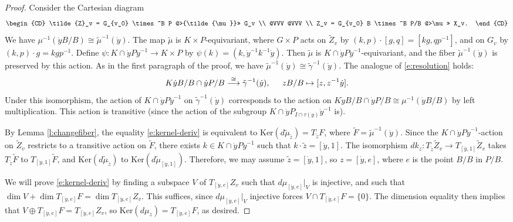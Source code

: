\documentclass[11pt,letterpaper,reqno]{amsart}
\numberwithin{equation}{section}
\theoremstyle{plain}
\theoremstyle{definition}
\theoremstyle{remark}
\begin{document}
\begin{proof}
Consider the Cartesian diagram
$$
\begin{CD}
\tilde{Z}_v = G_{v_0} \times^B P @>{\tilde{\mu}}>> G_v \\
@VVV @VVV \\
Z_v = G_{v_0} B \times^B P/B @>\mu>> X_v. 
\end{CD}
$$
We have $\mu^{-1}(\dot{y}B/B) \cong \tilde{\mu}^{-1}(\dot{y})$.
The map $\tilde{\mu}$ is $K \times P$-equivariant, where $G \times P$ acts on $\tilde{Z}_v$ by $(k, p) \cdot [g, q] = [k g, q p^{-1}]$, and on $G_v$ by $(k,p) \cdot g = k g p^{-1}$.
Define $\psi: K\cap \dot{y}P \dot{y}^{-1} \to K \times P$
by $\psi(k) = (k, \dot{y}^{-1} k^{-1} \dot{y})$.  Then $\tilde{\mu}$ is $K\cap \dot{y}P \dot{y}^{-1}$-equivariant, and the fiber $\tilde{\mu}^{-1}(\dot{y})$ is preserved
by this action.  As in the first paragraph of the proof, we have $\tilde{\mu}^{-1}(\dot{y}) \cong \tilde{\gamma}^{-1}(\dot{y})$.  The analogue of 
\eqref{e:resolution} holds:
\begin{equation} \label{e:resolution2}
 K\dot{y}B/B \cap \dot{y}P/B \stackrel{\cong}{\longrightarrow} \tilde{\gamma}^{-1}(\dot{y}), \hspace{0.2in} zB/B \mapsto [z, z^{-1}\dot{y} ].
\end{equation}
Under this isomorphism, the action of $K\cap \dot{y}P \dot{y}^{-1}$ on $\tilde{\gamma}^{-1}(\dot{y})$
corresponds to the action on $K\dot{y}B/B \cap \dot{y}P/B \cong  \mu^{-1}(\dot{y}B/B)$ by left multiplication.  This action
is transitive (since the action of the subgroup $K\cap \dot{y}P_{I \cap \tau(y)} \dot{y}^{-1}$ is).

By Lemma \ref{l:changefiber}, the equality \eqref{e:kernel-deriv} is equivalent to
$\mathrm{Ker}(d \tilde{\mu}_{\tilde{z}})=T_{\tilde{z}} F$,
where $\tilde{F} = \tilde{\mu}^{-1}(\dot{y})$.  Since
the $K \cap \dot{y}P \dot{y}^{-1}$-action on $\tilde{Z}_v$ restricts to a transitive action on $\tilde{F}$,
there exists
$k \in K \cap \dot{y}P \dot{y}^{-1}$ such that $k \cdot \tilde{z}= [\dot{y},1]$.  
The isomorphism $dk_z: T_{\tilde{z} }\tilde{Z}_v \to T_{[\dot{y},1]} \tilde{Z}_v$ takes $T_{\tilde{z} }\tilde{F}$ to 
$T_{[\dot{y},1]} \tilde{F}$, and $\mathrm{Ker}(d\tilde{\mu}_{\tilde{z}})$ to $\mathrm{Ker}(d \tilde{\mu}_{[\dot{y},1]})$.  Therefore, we may assume $\tilde{z} = [\dot{y},1]$,
so $z = [\dot{y}, e]$, where $e$ is the point $B/B$ in $P/B$.

We will prove \eqref{e:kernel-deriv} by finding a subspace $V$ of $T_{[\dot{y},e]} Z_v$ such that
$d\mu_{[\dot{y},e]}|_V$ is injective, and such that $\dim V + \dim T_{[\dot{y},e]} F = \dim T_{[\dot{y},e]} Z_v$.  
This suffices, since $d\mu_{[\dot{y},e]}|_V$ injective forces $V \cap T_{[\dot{y},e]} F  = \{ 0 \}$.  
The dimension equality then implies that $ V \oplus T_{[\dot{y},e]} F =  T_{[\dot{y},e]} Z_v$, so
$\mathrm{Ker}(d\mu_z)=T_{[\dot{y},e]} F$, as desired.


\end{proof}
\end{document}
